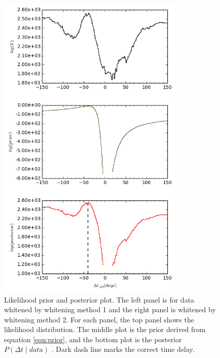\documentclass[\docopts]{\docclass}
\begin{document}
\begin{figure}[!h]
\begin{minipage}[bottom]{0.4\textwidth}
\includegraphics[width=\textwidth, height=15cm, keepaspectratio]{whiten2/data10_full_log.png}
  \end{minipage}
 \caption{Likelihood prior and posterior plot. The left panel is for data whitened by whitening method 1 and the right panel is whitened by whitening method 2. For each panel, the top panel shows the likelihood distribution. The middle plot is the prior derived from equation \ref{eqn:prior}, and the bottom plot is the posterior $P(\Delta t \mid data)$ . Dark dash line marks the correct time delay. }
\end{figure}
\end{document}
